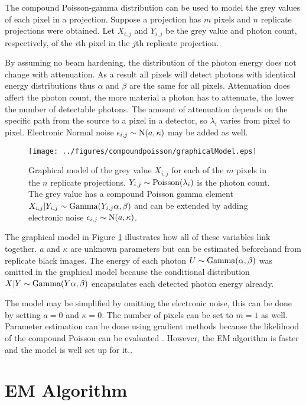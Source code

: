 The compound Poisson-gamma distribution can be used to model the grey values of each pixel in a projection. Suppose a projection has $m$ pixels and $n$ replicate projections were obtained. Let $X_{i,j}$ and $Y_{i,j}$ be the grey value and photon count, respectively, of the $i$th pixel in the $j$th replicate projection.

By assuming no beam hardening, the distribution of the photon energy does not change with attenuation. As a result all pixels will detect photons with identical energy distributions thus $\alpha$ and $\beta$ are the same for all pixels. Attenuation does affect the photon count, the more material a photon has to attenuate, the lower the number of detectable photons. The amount of attenuation depends on the specific path from the source to a pixel in a detector, so $\lambda_i$ varies from pixel to pixel. Electronic Normal noise $\epsilon_{i,j}\sim\operatorname{N}(a,\kappa)$ may be added as well.

\begin{figure}
  \centering
  \texttt{[image: ../figures/compoundpoisson/graphicalModel.eps]}
  \caption{Graphical model of the grey value $X_{i,j}$ for each of the $m$ pixels in the $n$ replicate projections. $Y_{i,j}\sim\operatorname{Poisson}(\lambda_i)$ is the photon count. The grey value has a compound Poisson gamma element $X_{i,j}|Y_{i,j}\sim\operatorname{Gamma}(Y_{i,j}\alpha,\beta)$ and can be extended by adding electronic noise $\epsilon_{i,j}\sim\operatorname{N}(a,\kappa)$.}
  \label{fig:compoundPoisson_graphicalModel}
\end{figure}

The graphical model in Figure \ref{fig:compoundPoisson_graphicalModel} illustrates how all of these variables link together. $a$ and $\kappa$ are unknown parameters but can be estimated beforehand from replicate black images. The energy of each photon $U\sim\operatorname{Gamma}(\alpha,\beta)$ was omitted in the graphical model because the conditional distribution $X|Y\sim\operatorname{Gamma}(Y\alpha,\beta)$ encapsulates each detected photon energy already.

The model may be simplified by omitting the electronic noise, this can be done by setting $a=0$ and $\kappa=0$. The number of pixels can be set to $m=1$ as well. Parameter estimation can be done using gradient methods because the likelihood of the compound Poisson can be evaluated \citep{dunn2005series}. However, the EM algorithm is faster and the model is well set up for it.\citep{dempster1977maximum}.

\section{EM Algorithm}

